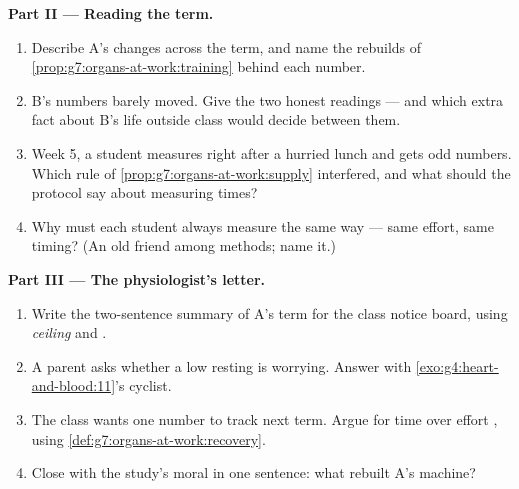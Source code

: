 \begin{problem}
\medskip\noindent\textbf{Part II --- Reading the term.}
\begin{enumerate}[resume]
  \item Describe A's changes across the term, and name
        the rebuilds of
        \cref{prop:g7:organs-at-work:training} behind
        each number.
  \item B's numbers barely moved. Give the two honest
        readings --- and which extra fact about B's life
        outside class would decide between them.
  \item Week 5, a student measures right after a hurried
        lunch and gets odd numbers. Which rule of
        \cref{prop:g7:organs-at-work:supply} interfered,
        and what should the protocol say about measuring
        times?
  \item Why must each student always measure the same
        way --- same effort, same timing? (An old friend
        among methods; name it.)
\end{enumerate}

\medskip\noindent\textbf{Part III --- The physiologist's
letter.}
\begin{enumerate}[resume]
  \item Write the two-sentence summary of A's term for
        the class notice board, using \emph{ceiling} and
        \emph{}.
  \item A parent asks whether a low resting  is
        worrying. Answer with
        \cref{exo:g4:heart-and-blood:11}'s cyclist.
  \item The class wants one number to track next term.
        Argue for  time over effort , using
        \cref{def:g7:organs-at-work:recovery}.
  \item Close with the study's moral in one sentence:
        what rebuilt A's machine?
\end{enumerate}
\end{problem}
